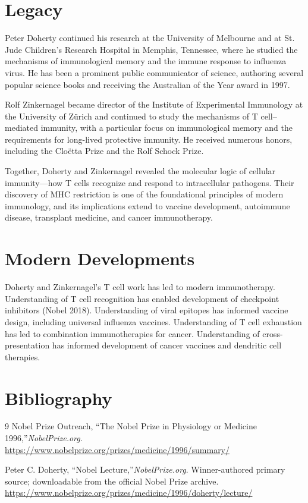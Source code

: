 \section{Legacy}

Peter Doherty continued his research at the University of Melbourne and at St. Jude Children's Research Hospital in Memphis, Tennessee, where he studied the mechanisms of immunological memory and the immune response to influenza virus. He has been a prominent public communicator of science, authoring several popular science books and receiving the Australian of the Year award in 1997.

Rolf Zinkernagel became director of the Institute of Experimental Immunology at the University of Z{\"u}rich and continued to study the mechanisms of T cell--mediated immunity, with a particular focus on immunological memory and the requirements for long-lived protective immunity. He received numerous honors, including the Cloëtta Prize and the Rolf Schock Prize.

Together, Doherty and Zinkernagel revealed the molecular logic of cellular immunity---how T cells recognize and respond to intracellular pathogens. Their discovery of MHC restriction is one of the foundational principles of modern immunology, and its implications extend to vaccine development, autoimmune disease, transplant medicine, and cancer immunotherapy.


\section{Modern Developments}

Doherty and Zinkernagel's T cell work has led to modern immunotherapy. Understanding of T cell recognition has enabled development of checkpoint inhibitors (Nobel 2018). Understanding of viral epitopes has informed vaccine design, including universal influenza vaccines. Understanding of T cell exhaustion has led to combination immunotherapies for cancer. Understanding of cross-presentation has informed development of cancer vaccines and dendritic cell therapies.


\section{Bibliography}

\begin{thebibliography}{9}
Nobel Prize Outreach, ``The Nobel Prize in Physiology or Medicine 1996,''\emph{NobelPrize.org}.\\
\url{https://www.nobelprize.org/prizes/medicine/1996/summary/}

Peter C. Doherty, ``Nobel Lecture,''\emph{NobelPrize.org}. Winner-authored primary source; downloadable from the official Nobel Prize archive.\\
\url{https://www.nobelprize.org/prizes/medicine/1996/doherty/lecture/}
\end{thebibliography}
